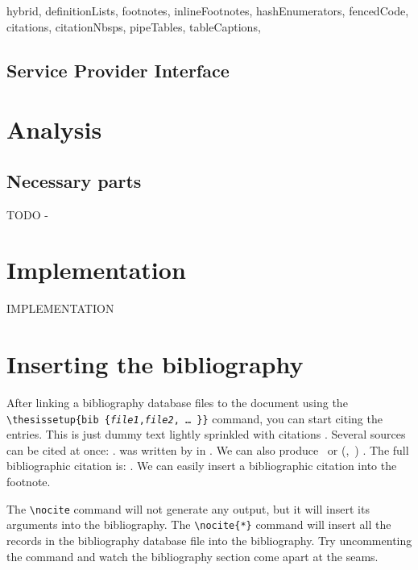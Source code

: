 \documentclass[
  digital,     %
  oneside,     %
  nosansbold,  %
  nocolorbold, %
  lof,         %
  lot,         %
]{fithesis4}
\begin{document}
\begin{markdown*}{%
  hybrid,
  definitionLists,
  footnotes,
  inlineFootnotes,
  hashEnumerators,
  fencedCode,
  citations,
  citationNbsps,
  pipeTables,
  tableCaptions,
}
\section{Service Provider Interface}

\chapter{Analysis}
\shorthandoff{-}


\section{Necessary parts}
TODO -


\shorthandon{-}


\chapter{Implementation}
\shorthandoff{-}

IMPLEMENTATION
\end{markdown*}
\shorthandon{-}

\chapter{Inserting the bibliography}
After linking a bibliography data\-base files to the document using
the \verb"\"\texttt{thesis\discretionary{-}{}{}setup\{bib\discretionary{=}{=}{=}%
\{\textit{file1},\textit{file2},\,\ldots\,\}\}} command, you can
start citing the entries. This is just dummy text
\parencite{borgman03} lightly sprinkled with citations
\parencite[p.~123]{greenberg98}. Several sources can be cited at
once: \cite{borgman03,greenberg98,thanh01}.
 was written by \citeauthor{greenberg98} in
\citeyear{greenberg98}. We can also produce \textcite{greenberg98}%
\ or %
\def\citeauthoryear#1{(\textcite{#1},~\citeyear{#1})}%
\citeauthoryear{greenberg98}%
. The full bibliographic citation is:
\emph{}. We can easily insert a bibliographic
citation into the footnote.

The \verb"\nocite" command will not generate any
output\nocite{muni}, but it will insert its arguments into
the bibliography. The \verb"\nocite{*}" command will insert all the
records in the bibliography database file into the bibliography.
Try uncommenting the command
and watch the bibliography section come apart at the seams.
\end{document}
